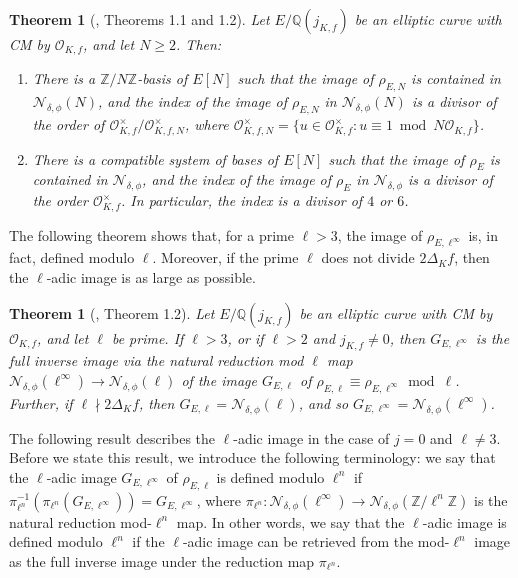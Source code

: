 \documentclass[11pt]{amsart}
\newtheorem{thm}[defn]{Theorem}
\newtheorem{theorem}[defn]{Theorem}
\theoremstyle{definition}
\newcommand{\Q}{\mathbb Q}
\newcommand{\Z}{\mathbb Z}
\newcommand{\Of}{\mathcal{O}_{K,f}}
\newcommand{\OO}{\mathcal{O}}
\begin{document}
\begin{theorem}[\cite{lozano-galoiscm}, Theorems 1.1 and 1.2]\label{thm-cmrep-intro-alvaro}\label{thm-firstofsec1} Let $E/\Q(j_{K,f})$ be an elliptic curve with CM by $\OO_{K,f}$, and let $N\geq 2$.
	 Then:
	\begin{enumerate}
            \item There is a $\Z/N\Z$-basis of $E[N]$ such that the image of $\rho_{E,N}$
	is contained in $\mathcal{N}_{\delta,\phi}(N)$, and	 the index of the image of $\rho_{E,N}$ in $\mathcal{N}_{\delta,\phi}(N)$ is a divisor of the order of $\Of^\times/\mathcal{O}_{K,f,N}^\times$, where $\mathcal{O}_{K,f,N}^\times=\{u\in\Of^\times: u\equiv 1 \bmod N\Of\}$.
		\item There is a compatible system of bases of $E[N]$ such that the image of $\rho_E$ is contained in $\mathcal{N}_{\delta,\phi}$, and the index of the image of $\rho_{E}$ in $\mathcal{N}_{\delta,\phi}$ is a divisor of the order $\Of^\times$. In particular, the index is a divisor of $4$ or $6$. 
	\end{enumerate} 
\end{theorem}

The following theorem shows that, for a prime $\ell>3$, the image of $\rho_{E,\ell^\infty}$ is, in fact, defined modulo $\ell$. Moreover, if the prime $\ell$ does not divide $2\Delta_K f$, then the $\ell$-adic image is as large as possible.

\begin{thm}[\cite{lozano-galoiscm}, Theorem 1.2]\label{thm-goodredn}
Let $E/\Q(j_{K,f})$ be an elliptic curve with CM by $\OO_{K,f}$, and let $\ell$ be prime. If $\ell > 3$, or if $\ell > 2$ and $j_{K,f} \neq 0$, then $G_{E,\ell^\infty}$ is the full inverse image via the natural reduction mod $\ell$ map $\mathcal{N}_{\delta,\phi}(\ell^\infty)\to \mathcal{N}_{\delta,\phi}(\ell)$ of the image $G_{E,\ell}$ of $\rho_{E,\ell}\equiv \rho_{E,\ell^\infty}\bmod \ell$. Further, if $\ell \nmid 2 \Delta_K f$, then $G_{E,\ell} = \mathcal{N}_{\delta, \phi}(\ell)$, and so $G_{E,\ell^{\infty}} = \mathcal{N}_{\delta, \phi}(\ell^{\infty})$.
\end{thm}

The following result describes the $\ell$-adic image in the case of $j=0$ and $\ell \neq 3$. Before we state this result, we introduce the following terminology: we say that the $\ell$-adic image $G_{E,\ell^\infty}$ of $\rho_{E,\ell}$ is defined modulo $\ell^n$ if $\pi_{\ell^n}^{-1}(\pi_{\ell^n}(G_{E,\ell^\infty}))=G_{E,\ell^\infty}$, where $\pi_{\ell^n}\colon \mathcal{N}_{\delta,\phi}(\ell^{\infty})\to \mathcal{N}_{\delta,\phi}(\Z/\ell^n\Z)$ is the natural reduction mod-$\ell^n$ map.  In other words, we say that the $\ell$-adic image is defined modulo $\ell^n$ if the $\ell$-adic image can be retrieved from the mod-$\ell^n$ image as the full inverse image under the reduction map $\pi_{\ell^n}$.
\end{document}
